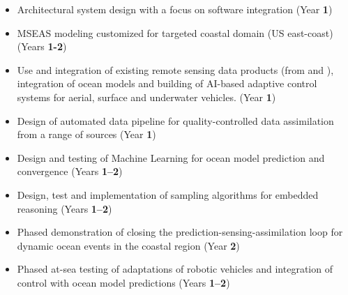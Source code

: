 
\ifkeck

\begin{itemize}[noitemsep,topsep=0pt,parsep=5pt,partopsep=10pt]

\item Architectural system design with a focus on software
  integration (Year \textbf{1})

\item MSEAS modeling customized for targeted coastal domain (US
  east-coast) (Years \textbf{1-2})

\item Use and integration of existing remote sensing data products
  (from \esa and \nase), integration of ocean models and building of
  AI-based adaptive control systems for aerial, surface and underwater
  vehicles.  (Year \textbf{1})

\item Design of automated data pipeline for quality-controlled data
  assimilation from a range of sources (Year \textbf{1})

\item Design and testing of Machine Learning for ocean model
  prediction and convergence (Years \textbf{1--2})

\item Design, test and implementation of sampling algorithms for
  embedded reasoning (Years \textbf{1--2})

\item Phased demonstration of closing the
  prediction-sensing-assimilation loop for dynamic ocean events in the
  coastal region (Year \textbf{2})

\item Phased at-sea testing of adaptations of robotic vehicles and
  integration of control with ocean model predictions (Years
  \textbf{1--2})



\end{itemize}
